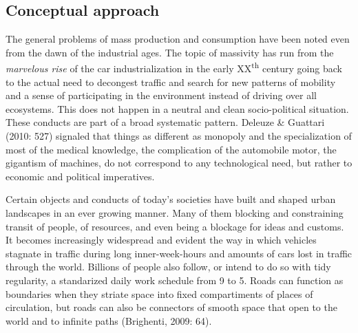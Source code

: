 \pagebreak
\subsection*{Conceptual approach} %
The general problems of mass production and consumption %
have been noted even from the dawn of the industrial ages. 
The topic of massivity has run from the \textit{marvelous rise} of the car industrialization in the early XX\textsuperscript{th} century going back to the actual need to decongest traffic and search for new patterns of mobility and a sense of participating in the environment instead of driving over all ecosystems. This does not happen in a neutral and clean socio-political situation.
%
These conducts are part of a broad systematic pattern.
Deleuze \& Guattari (2010: 527)
signaled that
things as different as monopoly and the specialization of most of the medical knowledge,
the complication of the automobile motor, the gigantism of machines, do not correspond to any technological need,
but rather to economic and political imperatives. %

Certain objects and conducts of today's societies have built and shaped urban landscapes in an ever growing manner.
Many of them blocking and constraining transit of people, of resources, and even being a blockage for ideas and customs.
It becomes increasingly widespread and evident the way in which vehicles stagnate in traffic during 
long inner-week-hours and amounts of cars lost in traffic through the world. 
Billions of people also follow, or intend to do so with tidy regularity, a standarized daily work schedule from 9 to 5.
Roads can function as boundaries when they striate space into fixed compartiments of places of circulation,
but roads can also be connectors of smooth space that open to the world and to infinite paths (Brighenti, 2009: 64).

